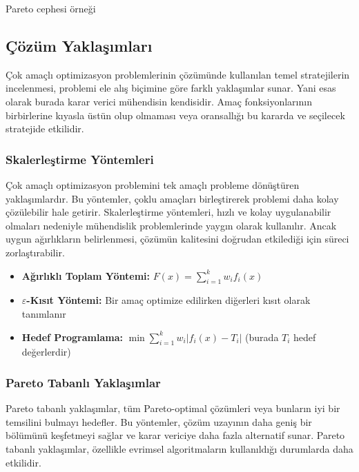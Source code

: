 \begin{marginfigure}
\centering
{}
\caption{Pareto cephesi örneği}
\end{marginfigure}

\subsection{Çözüm Yaklaşımları}
Çok amaçlı optimizasyon problemlerinin çözümünde kullanılan temel stratejilerin incelenmesi, problemi ele alış biçimine göre farklı yaklaşımlar sunar. Yani esas olarak burada karar verici mühendisin kendisidir. Amaç fonksiyonlarının birbirlerine kıyasla üstün olup olmaması veya oransallığı bu kararda ve seçilecek stratejide etkilidir.

\subsubsection{Skalerleştirme Yöntemleri}
Çok amaçlı optimizasyon problemini tek amaçlı probleme dönüştüren yaklaşımlardır. Bu yöntemler, çoklu amaçları birleştirerek problemi daha kolay çözülebilir hale getirir. Skalerleştirme yöntemleri, hızlı ve kolay uygulanabilir olmaları nedeniyle mühendislik problemlerinde yaygın olarak kullanılır. Ancak uygun ağırlıkların belirlenmesi, çözümün kalitesini doğrudan etkilediği için süreci zorlaştırabilir.

\begin{tcolorbox}[title=Yaygın Skalerleştirme Yöntemleri]
\begin{itemize}
    \item \textbf{Ağırlıklı Toplam Yöntemi:} $F(x) = \sum_{i=1}^{k} w_i f_i(x)$
    \item \textbf{$\varepsilon$-Kısıt Yöntemi:} Bir amaç optimize edilirken diğerleri kısıt olarak tanımlanır
    \item \textbf{Hedef Programlama:} $\min \sum_{i=1}^{k} w_i |f_i(x) - T_i|$ (burada $T_i$ hedef değerlerdir)
\end{itemize}
\end{tcolorbox}

\subsubsection{Pareto Tabanlı Yaklaşımlar}
Pareto tabanlı yaklaşımlar, tüm Pareto-optimal çözümleri veya bunların iyi bir temsilini bulmayı hedefler. Bu yöntemler, çözüm uzayının daha geniş bir bölümünü keşfetmeyi sağlar ve karar vericiye daha fazla alternatif sunar. Pareto tabanlı yaklaşımlar, özellikle evrimsel algoritmaların kullanıldığı durumlarda daha etkilidir.

